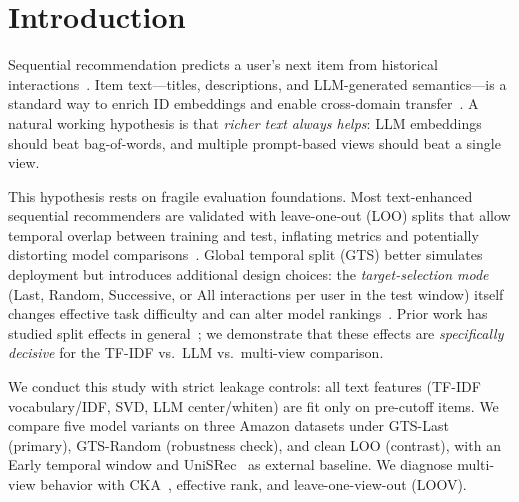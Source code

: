 \documentclass[sigconf,natbib=true,anonymous]{acmart}
\newcommand{\tfidf}{\textsc{TF-IDF}\xspace}
\newcommand{\llm}{\textsc{LLM}\xspace}
\begin{document}

\maketitle

\section{Introduction}
\label{sec:intro}

Sequential recommendation predicts a user's next item from historical interactions~\cite{kang2018sasrec,sun2019bert4rec,hidasi2016gru4rec}.
Item text---titles, descriptions, and LLM-generated semantics---is a standard way to enrich ID embeddings and enable cross-domain transfer~\cite{hou2022unisrec,bao2023tallrec}.
A natural working hypothesis is that \emph{richer text always helps}: LLM embeddings should beat bag-of-words, and multiple prompt-based views should beat a single view.

This hypothesis rests on fragile evaluation foundations.
Most text-enhanced sequential recommenders are validated with leave-one-out (LOO) splits that allow temporal overlap between training and test, inflating metrics and potentially distorting model comparisons~\cite{ji2023evaluation,sun2023reevaluation}.
Global temporal split (GTS) better simulates deployment but introduces additional design choices: the \emph{target-selection mode} (Last, Random, Successive, or All interactions per user in the test window) itself changes effective task difficulty and can alter model rankings~\cite{liang2024timetosplit}.
Prior work has studied split effects in general~\cite{meng2020temporal,ji2023evaluation}; we demonstrate that these effects are \emph{specifically decisive} for the \tfidf vs.\ \llm vs.\ multi-view comparison.

We conduct this study with strict leakage controls: all text features (\tfidf vocabulary/IDF, SVD, LLM center/whiten) are fit only on pre-cutoff items.
We compare five model variants on three Amazon datasets under GTS-Last (primary), GTS-Random (robustness check), and clean LOO (contrast), with an Early temporal window and UniSRec~\cite{hou2022unisrec} as external baseline.
We diagnose multi-view behavior with CKA~\cite{kornblith2019cka}, effective rank, and leave-one-view-out (LOOV).
\end{document}
